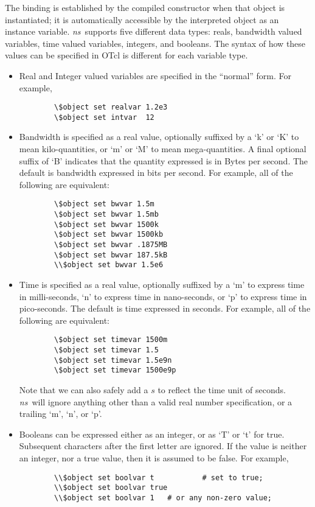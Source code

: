 The binding is established by the compiled constructor
when that object is instantiated;
it is automatically accessible by the interpreted object as 
an instance variable.
\emph{ns}\ supports five different data types: reals, bandwidth valued variables, 
time valued variables, integers, and booleans.
The syntax of how these values can be specified in OTcl is different
for each variable type.
\begin{itemize}\itemsep0pt
\item Real and Integer valued variables are specified in the ``normal'' form.
        For example,
        \begin{verbatim}
        \$object set realvar 1.2e3
        \$object set intvar  12
        \end{verbatim}
\item Bandwidth is specified as a real value, optionally
  suffixed by a `k' or `K' to mean kilo-quantities, or `m' or `M' to
  mean mega-quantities.
  A final optional suffix of `B' indicates that the quantity expressed
  is in Bytes per second.
  The default is bandwidth expressed in bits per second.
        For example, all of the following are equivalent:
        \begin{verbatim}
        \$object set bwvar 1.5m
        \$object set bwvar 1.5mb
        \$object set bwvar 1500k
        \$object set bwvar 1500kb
        \$object set bwvar .1875MB
        \$object set bwvar 187.5kB
        \\$object set bwvar 1.5e6
        \end{verbatim}

\item Time is specified as a real value, optionally suffixed by a
  `m' to express time in milli-seconds, `n' to express time in
  nano-seconds, or `p' to express time in pico-seconds.
  The default is time expressed in seconds.
        For example, all of the following are equivalent:
        \begin{verbatim}
        \$object set timevar 1500m
        \$object set timevar 1.5
        \$object set timevar 1.5e9n
        \$object set timevar 1500e9p
        \end{verbatim}
  Note that we can also safely add a $s$ to reflect the time unit of seconds.
  \emph{ns}\ will ignore anything other than a valid real number specification,
  or a trailing `m', `n', or `p'.

\item Booleans can be expressed either as an integer, or as `T' or `t'
  for true.  Subsequent characters after the first letter are ignored.
  If the value is neither an integer, nor a true value,
  then it is assumed to be false.
        For example,
        \begin{verbatim}
        \\$object set boolvar t           # set to true;
        \\$object set boolvar true
        \\$object set boolvar 1   # or any non-zero value;


\end{verbatim}
\end{itemize}
